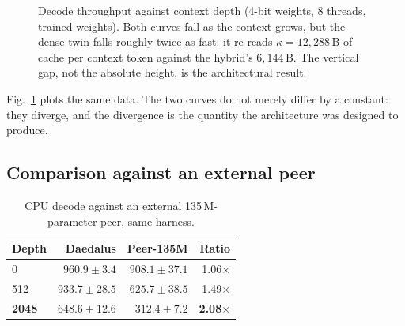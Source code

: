 \documentclass[conference]{IEEEtran}
\begin{document}
\begin{figure}[t]
\centering
{}
\caption{Decode throughput against context depth (4-bit weights, 8 threads,
trained weights). Both curves fall as the context grows, but the dense twin
falls roughly twice as fast: it re-reads $\kappa=12{,}288$\,B of cache per
context token against the hybrid's $6{,}144$\,B. The vertical gap, not the
absolute height, is the architectural result.}
\label{fig:decode}
\end{figure}

Fig.~\ref{fig:decode} plots the same data. The two curves do not merely differ
by a constant: they diverge, and the divergence is the quantity the architecture
was designed to produce.

\subsection{Comparison against an external peer}

\begin{table}[t]
\caption{CPU decode against an external 135\,M-parameter peer, same harness.}
\label{tab:peerdecode}
\centering
\begin{tabular}{@{}lrrr@{}}
\toprule
\textbf{Depth} & \textbf{Daedalus} & \textbf{Peer-135M} & \textbf{Ratio} \\
\midrule
0            & $960.9 \pm 3.4$  & $908.1 \pm 37.1$ & 1.06$\times$ \\
512          & $933.7 \pm 28.5$ & $625.7 \pm 38.5$ & 1.49$\times$ \\
\textbf{2048} & $\mathbf{648.6 \pm 12.6}$ & $\mathbf{312.4 \pm 7.2}$ & \textbf{2.08$\times$} \\
\bottomrule
\end{tabular}
\end{table}
\end{document}
